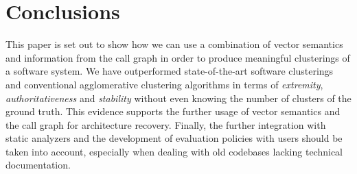 \documentclass[sigconf, screen]{acmart}
\begin{document}
\section{Conclusions} 

This paper is set out to show how we can use a combination of vector semantics
and information from the call graph in order to produce meaningful clusterings of a software system.
We have outperformed state-of-the-art software clusterings and conventional
agglomerative clustering algorithms 
in terms of \emph{extremity}, \emph{authoritativeness} and \emph{stability} 
without even knowing the number of clusters of the ground truth. This evidence 
supports the further usage of vector semantics and the call graph for architecture recovery.
Finally, the further integration with static analyzers and the development of evaluation policies with users should be taken into account, especially when dealing with old codebases lacking technical documentation.

\newpage


\end{document}
